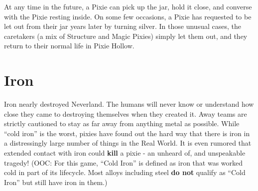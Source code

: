 \documentclass[blue]{PP}
\begin{document}
At any time in the future, a Pixie can pick up the jar, hold it close, and converse with the Pixie resting inside. On some few occasions, a Pixie has requested to be let out from their jar years later by turning silver. In those unusual cases, the caretakers (a mix of Structure and Magic Pixies) simply let them out, and they return to their normal life in Pixie Hollow.

\section*{Iron}
Iron nearly destroyed Neverland. The humans will never know or understand how close they came to destroying themselves when they created it. Away teams are strictly cautioned to stay as far away from anything metal as possible. While “cold iron” is the worst, pixies have found out the hard way that there is iron in a distressingly large number of things in the Real World. It is even rumored that extended contact with iron could \textbf{kill} a pixie - an unheard of, and unspeakable tragedy! (OOC: For this game, “Cold Iron” is defined as iron that was worked cold in part of its lifecycle. Most alloys including steel \textbf{do not} qualify as “Cold Iron” but still have iron in them.)
\end{document}
